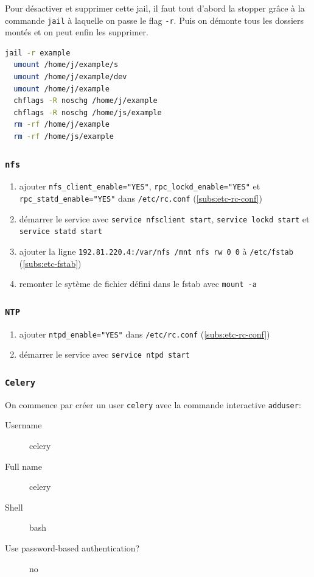 \documentclass[10pt,a4paper]{article}
\begin{document}
Pour désactiver et supprimer cette jail, il faut tout d'abord la stopper grâce à la commande \texttt{jail} à laquelle on passe le flag \texttt{-r}.
Puis on démonte tous les dossiers montés et on peut enfin les supprimer.
\begin{lstlisting}[language=bash]
  jail -r example
  umount /home/j/example/s
  umount /home/j/example/dev
  umount /home/j/example
  chflags -R noschg /home/j/example
  chflags -R noschg /home/js/example
  rm -rf /home/j/example
  rm -rf /home/js/example
\end{lstlisting}

\subsubsection{\texttt{nfs}}
\begin{enumerate}
  \item ajouter \texttt{nfs\_client\_enable="YES"}, \texttt{rpc\_lockd\_enable="YES"} et \texttt{rpc\_statd\_enable="YES"} dans \texttt{/etc/rc.conf} (\ref{subs:etc-rc-conf})
  \item démarrer le service avec \texttt{service nfsclient start}, \texttt{service lockd start} et \texttt{service statd start}
  \item ajouter la ligne \texttt{192.81.220.4:/var/nfs        /mnt        nfs        rw        0        0} à \texttt{/etc/fstab} (\ref{subs:etc-fstab})
  \item remonter le sytème de fichier défini dans le fstab avec \texttt{mount -a}
\end{enumerate}

\subsubsection{\texttt{NTP}}
\begin{enumerate}
  \item ajouter \texttt{ntpd\_enable="YES"} dans \texttt{/etc/rc.conf} (\ref{subs:etc-rc-conf})
  \item démarrer le service avec \texttt{service ntpd start}
\end{enumerate}

\subsubsection{\texttt{Celery}}
On commence par créer un user \texttt{celery} avec la commande interactive \texttt{adduser}:
\begin{description}
  \item[Username] celery
  \item[Full name] celery
  \item[Shell] bash
  \item[Use password-based authentication?] no
\end{description}
\end{document}
